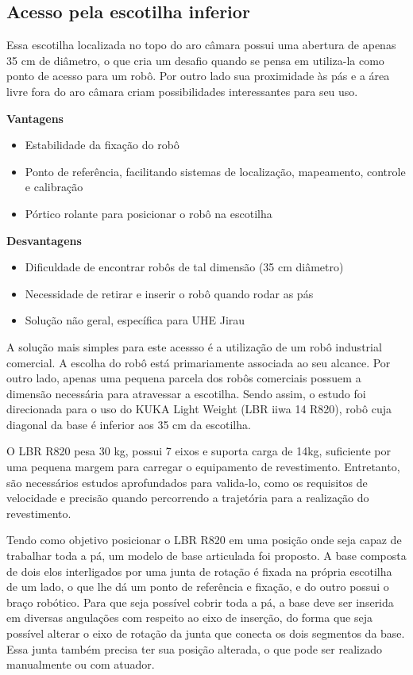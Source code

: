 \subsection{Acesso pela escotilha inferior}
Essa escotilha localizada no topo do aro câmara possui uma abertura de apenas
35 cm de diâmetro, o que cria um desafio quando se pensa em utiliza-la como
ponto de acesso para um robô. Por outro lado sua proximidade às pás e a área livre fora do aro
câmara criam possibilidades interessantes para seu uso.

\textbf{Vantagens}
\begin{itemize}
  \item Estabilidade da fixação do robô
  \item Ponto de referência, facilitando sistemas de localização, mapeamento, controle e calibração
  \item Pórtico rolante para posicionar o robô na escotilha
\end{itemize}

\textbf{Desvantagens}
\begin{itemize}
  \item Dificuldade de encontrar robôs de tal dimensão (35 cm diâmetro)
  \item Necessidade de retirar e inserir o robô quando rodar as pás
  \item Solução não geral, específica para UHE Jirau
\end{itemize}

A solução mais simples para este acessso é a utilização de um robô industrial
comercial. A escolha do robô está primariamente associada ao seu alcance. Por outro lado, apenas
uma pequena parcela dos robôs comerciais possuem a dimensão necessária para
atravessar a escotilha. Sendo assim, o estudo foi direcionada para o uso do
KUKA Light Weight (LBR iiwa 14 R820), robô cuja diagonal da base é inferior aos
35 cm da escotilha.

O LBR R820 pesa 30 kg, possui 7 eixos e suporta carga de 14kg,
suficiente por uma pequena margem para carregar o equipamento de
revestimento. Entretanto, são necessários estudos aprofundados para valida-lo,
como os requisitos de velocidade e precisão quando percorrendo a trajetória
para a realização do revestimento.

Tendo como objetivo posicionar o LBR R820 em uma posição onde seja capaz de
trabalhar toda a pá, um modelo de base articulada foi proposto. A base
composta de dois elos interligados por uma junta de rotação é fixada na
própria escotilha de um lado, o que lhe dá um ponto de referência e fixação, e
do outro possui o braço robótico. Para que seja possível cobrir toda a pá,
a base deve ser inserida em diversas angulações com respeito ao
eixo de inserção, do forma que seja possível alterar o eixo de rotação da junta
que conecta os dois segmentos da base. Essa junta também precisa ter sua posição
alterada, o que pode ser realizado manualmente ou com atuador.

